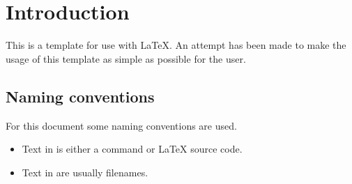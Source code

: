 
\section{Introduction}

This is a template for use with \LaTeX{}. An attempt has been made to make
the usage of this template as simple as possible for the user.

\subsection{Naming conventions}

For this document some naming conventions are used.

\begin{itemize}
    \item Text in  is either a command or
          \LaTeX{} source code.
    \item Text in  are usually filenames.
\end{itemize}
